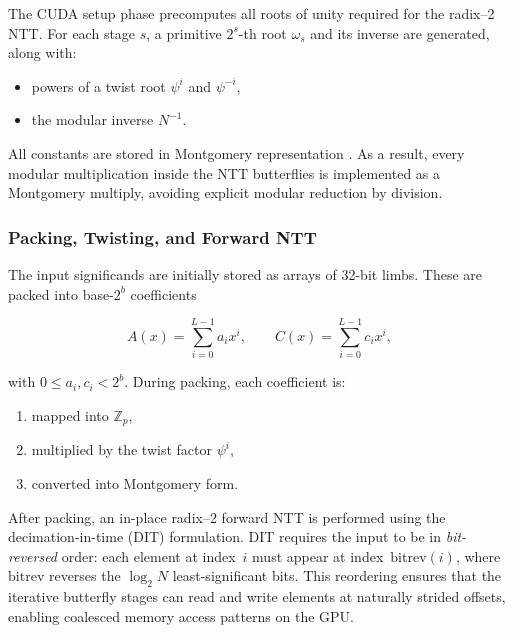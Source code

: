 The CUDA setup phase precomputes all roots of unity required for the radix--2
NTT. For each stage $s$, a primitive $2^s$-th root $\omega_s$ and its inverse
are generated, along with:

\begin{itemize}

  \item powers of a twist root $\psi^i$ and $\psi^{-i}$,

  \item the modular inverse $N^{-1}$.

\end{itemize}

All constants are stored in Montgomery representation \cite{Montgomery1985Modular}. As a result, every
modular multiplication inside the NTT butterflies is implemented as a Montgomery
multiply, avoiding explicit modular reduction by division.

\subsubsection{Packing, Twisting, and Forward NTT}

The input significands are initially stored as arrays of 32-bit limbs. These are
packed into base-$2^b$ coefficients

\[
A(x) = \sum_{i=0}^{L-1} a_i x^i,\qquad
C(x) = \sum_{i=0}^{L-1} c_i x^i,
\]

with $0 \le a_i, c_i < 2^b$. During packing, each coefficient is:

\begin{enumerate}

  \item mapped into $\mathbb{Z}_p$,

  \item multiplied by the twist factor $\psi^i$,

  \item converted into Montgomery form.

\end{enumerate}

After packing, an in-place radix--2 forward NTT is performed using the
decimation-in-time (DIT) formulation.  DIT requires the input to be in
\emph{bit-reversed} order: each element at index~$i$ must appear at
index~$\mathrm{bitrev}(i)$, where $\mathrm{bitrev}$ reverses the
$\log_2 N$ least-significant bits.  This reordering ensures that the iterative
butterfly stages can read and write elements at naturally strided
offsets, enabling coalesced memory access patterns on the GPU.

